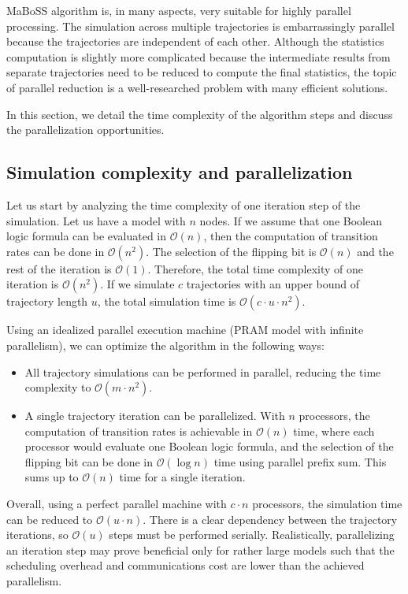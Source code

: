 \documentclass[times, twoside]{zHenriquesLab-StyleBioRxiv}
\begin{document}
MaBoSS algorithm is, in many aspects, very suitable for highly parallel processing. The simulation across multiple trajectories is embarrassingly parallel because the trajectories are independent of each other. Although the statistics computation is slightly more complicated because the intermediate results from separate trajectories need to be reduced to compute the final statistics, the topic of parallel reduction is a well-researched problem with many efficient solutions. 

In this section, we detail the time complexity of the algorithm steps and discuss the parallelization opportunities.

\subsection*{Simulation complexity and parallelization}

Let us start by analyzing the time complexity of one iteration step of the simulation. Let us have a model with $n$ nodes. If we assume that one Boolean logic formula can be evaluated in $\mathcal{O}(n)$, then the computation of transition rates can be done in $\mathcal{O}(n^2)$. The selection of the flipping bit is $\mathcal{O}(n)$ and the rest of the iteration is $\mathcal{O}(1)$. Therefore, the total time complexity of one iteration is $\mathcal{O}(n^2)$. If we simulate $c$ trajectories with an upper bound of trajectory length $u$, the total simulation time is $\mathcal{O}(c \cdot u \cdot n^2)$. 

Using an idealized parallel execution machine (PRAM model with infinite parallelism), we can optimize the algorithm in the following ways: 
\begin{itemize}
    \item All trajectory simulations can be performed in parallel, reducing the time complexity to $\mathcal{O}(m \cdot n^2)$.
    \item A single trajectory iteration can be parallelized. With $n$ processors, the computation of transition rates is achievable in $\mathcal{O}(n)$ time, where each processor would evaluate one Boolean logic formula, and the selection of the flipping bit can be done in $\mathcal{O}(\log{n})$ time using parallel prefix sum. This sums up to $\mathcal{O}(n)$ time for a single iteration. 
\end{itemize}

Overall, using a perfect parallel machine with $c \cdot n$ processors, the simulation time can be reduced to $\mathcal{O}(u \cdot n)$. There is a clear dependency between the trajectory iterations, so $\mathcal{O}(u)$ steps must be performed serially. Realistically, parallelizing an iteration step may prove beneficial only for rather large models such that the scheduling overhead and communications cost are lower than the achieved parallelism.
\end{document}
